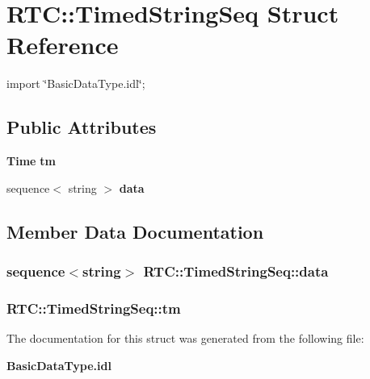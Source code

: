 \section{RTC::TimedStringSeq Struct Reference}
\label{structRTC_1_1TimedStringSeq}


{\ttfamily import \char`\"{}BasicDataType.idl\char`\"{};}

\subsection*{Public Attributes}
\begin{DoxyCompactItemize}
\item 
{\bf Time} {\bf tm}
\item 
sequence$<$ string $>$ {\bf data}
\end{DoxyCompactItemize}


\subsection{Member Data Documentation}
\subsubsection[{data}]{\setlength{\rightskip}{0pt plus 5cm}sequence$<$string$>$ {\bf RTC::TimedStringSeq::data}}\label{structRTC_1_1TimedStringSeq_a92c9a5f303b7115189a2b89ab1ceb40e}
\subsubsection[{tm}]{ {\bf RTC::TimedStringSeq::tm}}\label{structRTC_1_1TimedStringSeq_a26233554a1a8cddc491eaedc7d9338f2}


The documentation for this struct was generated from the following file:\begin{DoxyCompactItemize}
\item 
{\bf BasicDataType.idl}\end{DoxyCompactItemize}
